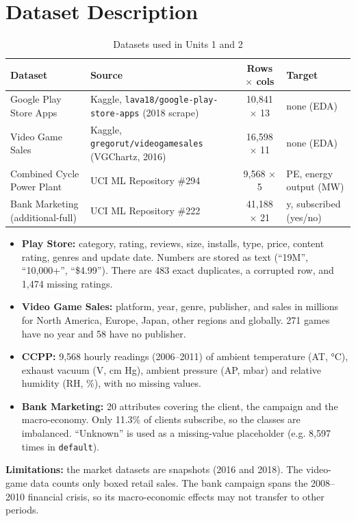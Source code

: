 \section{Dataset Description}
\begin{table}[H]
\centering
\caption{Datasets used in Units 1 and 2}
\label{tab:ds12}
\renewcommand{\arraystretch}{1.25}
\begin{tabularx}{\linewidth}{@{}>{\raggedright\arraybackslash}p{2.6cm} >{\raggedright\arraybackslash}X c >{\raggedright\arraybackslash}p{3.3cm}@{}}
\toprule
\textbf{Dataset} & \textbf{Source} & \textbf{Rows $\times$ cols} & \textbf{Target} \\
\midrule
Google Play Store Apps & Kaggle, \texttt{lava18/google-play-store-apps} (2018 scrape) & 10,841 $\times$ 13 & none (EDA) \\
Video Game Sales & Kaggle, \texttt{gregorut/videogamesales} (VGChartz, 2016) & 16,598 $\times$ 11 & none (EDA) \\
Combined Cycle Power Plant & UCI ML Repository \#294 & 9,568 $\times$ 5 & PE, energy output (MW) \\
Bank Marketing (additional-full) & UCI ML Repository \#222 & 41,188 $\times$ 21 & y, subscribed (yes/no) \\
\bottomrule
\end{tabularx}
\end{table}
\begin{itemize}
\item \textbf{Play Store:} category, rating, reviews, size, installs, type, price, content rating, genres and update date.
Numbers are stored as text (``19M'', ``10,000+'', ``\$4.99''). There are 483 exact duplicates, a corrupted row, and 1,474
missing ratings.
\item \textbf{Video Game Sales:} platform, year, genre, publisher, and sales in millions for North America, Europe,
Japan, other regions and globally. 271 games have no year and 58 have no publisher.
\item \textbf{CCPP:} 9,568 hourly readings (2006–2011) of ambient temperature (AT, °C), exhaust vacuum (V, cm Hg),
ambient pressure (AP, mbar) and relative humidity (RH, \%), with no missing values.
\item \textbf{Bank Marketing:} 20 attributes covering the client, the campaign and the macro-economy. Only 11.3\% of
clients subscribe, so the classes are imbalanced. ``Unknown'' is used as a missing-value placeholder (e.g. 8,597 times in
\texttt{default}).
\end{itemize}
\textbf{Limitations:} the market datasets are snapshots (2016 and 2018). The video-game data counts only boxed retail
sales. The bank campaign spans the 2008–2010 financial crisis, so its macro-economic effects may not transfer to other
periods.

